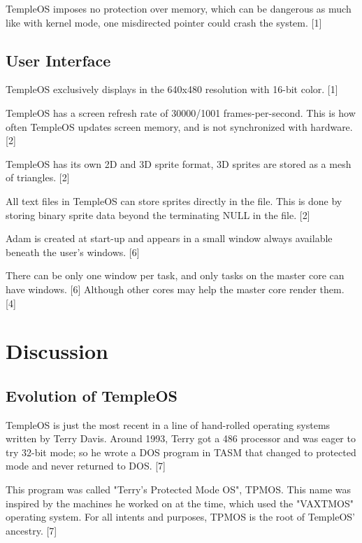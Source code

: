 \documentclass[11pt]{article}
\begin{document}
TempleOS imposes no protection over memory, which can be dangerous as much like
with kernel mode, one misdirected pointer could crash the system. [1]

 \newpage

\subsection{User Interface}
\label{sec:org5d6924e}

TempleOS exclusively displays in the 640x480 resolution with 16-bit color. [1]

TempleOS has a screen refresh rate of 30000/1001 frames-per-second. This is how
often TempleOS updates screen memory, and is not synchronized with hardware. [2]

TempleOS has its own 2D and 3D sprite format, 3D sprites are stored as a mesh of
triangles. [2]

All text files in TempleOS can store sprites directly in the file. This is done
by storing binary sprite data beyond the terminating NULL in the file. [2]

Adam is created at start-up and appears in a small window always available
beneath the user's windows. [6]

There can be only one window per task, and only tasks on the master core can
have windows. [6] Although other cores may help the master core render them. [4]

 \newpage

\section{Discussion}
\label{sec:org64941cc}

\subsection{Evolution of TempleOS}
\label{sec:orgc8f27d6}

TempleOS is just the most recent in a line of hand-rolled operating systems
written by Terry Davis. Around 1993, Terry got a 486 processor and was eager to
try 32-bit mode; so he wrote a DOS program in TASM that changed to protected
mode and never returned to DOS. [7]

This program was called "Terry's Protected Mode OS", TPMOS. This name was
inspired by the machines he worked on at the time, which used the "VAXTMOS"
operating system. For all intents and purposes, TPMOS is the root of TempleOS'
ancestry. [7]
\end{document}
